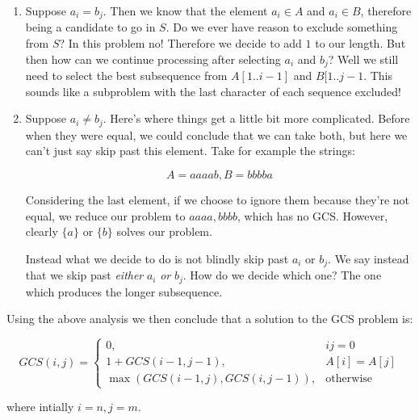 \begin{enumerate}[(1)]

\item Suppose $a_i = b_j$. Then we know that the element $a_i \in A$ and $a_i
\in B$, therefore being a candidate to go in $S$. Do we ever have reason to
exclude something from $S$? In this problem no! Therefore we decide to add $1$
to our length. But then how can we continue processing after selecting $a_i$ and
$b_j$? Well we still need to select the best subsequence from $A[1..i-1]$ and
$B[1..j-1$. This sounds like a subproblem with the last character of each
sequence excluded!

\item Suppose $a_i \neq b_j$. Here's where things get a little bit more
complicated. Before when they were equal, we could conclude that we can take
both, but here we can't just say skip past this element. Take for example the
strings:

$$
A = aaaab, B = bbbba
$$

Considering the last element, if we choose to ignore them because they're not
equal, we reduce our problem to $aaaa, bbbb$, which has no GCS. However,
clearly $\{a\}$ or $\{b\}$ solves our problem.

Instead what we decide to do is not blindly skip past $a_i$ or $b_j$. We say
instead that we skip past \textit{either} $a_i$ \textit{or} $b_j$. How do we
decide which one? The one which produces the longer subsequence.

\end{enumerate}

Using the above analysis we then conclude that a solution to the GCS problem is:

$$
GCS(i,j) = \begin{cases}
0, & ij = 0 \\
1 + GCS(i-1,j-1), & A[i] = A[j] \\
\max(GCS(i-1,j),GCS(i,j-1)), & \text{otherwise}
\end{cases}
$$

where intially $i = n, j = m$.

